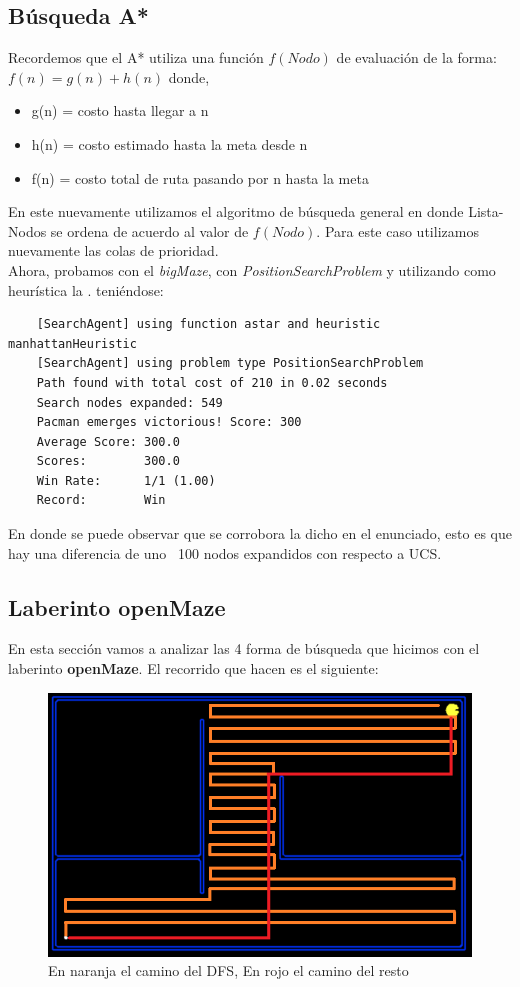 \documentclass[12pt, titlepage, a4paper]{article}
\begin{document}
\subsection{Búsqueda A*}
Recordemos que el A* utiliza una función $f(Nodo)$ de 
evaluación de la forma: $f(n) = g(n) + h(n)$ donde,
\begin{itemize}
    \item {g(n) = costo hasta llegar a n}
    \item {h(n) = costo estimado hasta la meta desde n}
    \item {f(n) = costo total de ruta pasando por n hasta la meta}
\end{itemize}

En este nuevamente utilizamos el algoritmo 
de búsqueda general 
en donde Lista-Nodos se ordena de
acuerdo al valor de $f(Nodo)$.
Para este caso utilizamos nuevamente las colas de prioridad.\\

Ahora, probamos con el \textit{bigMaze}, con \textit{PositionSearchProblem} y
 utilizando como heurística la .
teniéndose: 
\begin{verbatim}
    [SearchAgent] using function astar and heuristic manhattanHeuristic
    [SearchAgent] using problem type PositionSearchProblem
    Path found with total cost of 210 in 0.02 seconds
    Search nodes expanded: 549
    Pacman emerges victorious! Score: 300
    Average Score: 300.0
    Scores:        300.0
    Win Rate:      1/1 (1.00)
    Record:        Win
\end{verbatim}

En donde se puede observar que se corrobora la dicho en el enunciado, esto 
es que hay una diferencia de uno ~100 nodos expandidos con respecto a UCS.

\subsection{Laberinto openMaze}
En esta sección vamos a analizar las 4 forma de búsqueda que hicimos con 
el laberinto \textbf{openMaze}. El recorrido que hacen es el siguiente:

\begin{figure}[H]
    \centering
    \includegraphics[width=.6\textwidth]{Imagenes/caminos.png}
    \caption{En naranja el camino del DFS, En rojo el camino del resto}
\end{figure}
\end{document}
